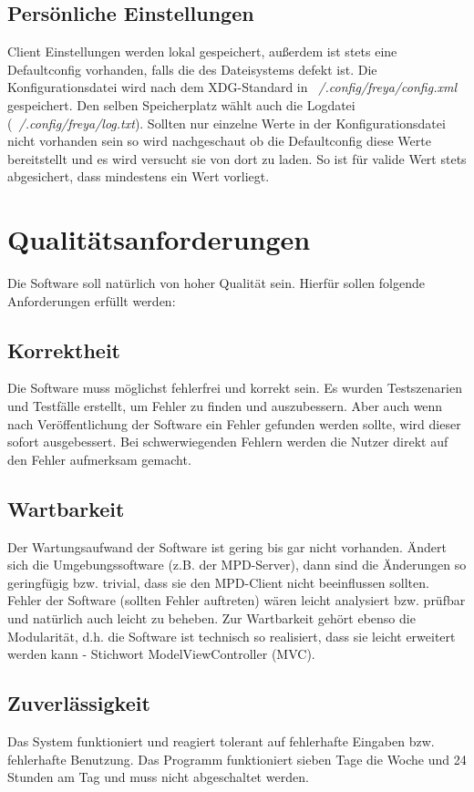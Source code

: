 \subsection{Persönliche Einstellungen}
Client Einstellungen werden lokal gespeichert, außerdem ist stets eine Defaultconfig vorhanden, falls die des Dateisystems defekt ist.
Die Konfigurationsdatei wird nach dem XDG-Standard in \emph{~/.config/freya/config.xml} gespeichert. Den selben Speicherplatz wählt auch die Logdatei 
(\emph{~/.config/freya/log.txt}). Sollten nur einzelne Werte in der Konfigurationsdatei nicht vorhanden sein so wird nachgeschaut ob die Defaultconfig
diese Werte bereitstellt und es wird versucht sie von dort zu laden. So ist für valide Wert stets abgesichert, dass mindestens ein Wert vorliegt.
\section{Qualitätsanforderungen}
Die Software soll natürlich von hoher Qualität sein. Hierfür sollen folgende
Anforderungen erfüllt werden:
\subsection{Korrektheit}
Die Software muss möglichst fehlerfrei und korrekt sein. Es wurden Testszenarien und Testfälle erstellt,
um Fehler zu finden und auszubessern. Aber auch wenn nach Veröffentlichung der Software ein 
Fehler gefunden werden sollte, wird dieser sofort ausgebessert. Bei schwerwiegenden Fehlern
werden die Nutzer direkt auf den Fehler aufmerksam gemacht.
\subsection{Wartbarkeit}
Der Wartungsaufwand der Software ist gering bis gar nicht vorhanden. Ändert sich die Umgebungssoftware
(z.B. der MPD-Server), dann sind die Änderungen so geringfügig bzw. trivial, dass sie den MPD-Client 
nicht beeinflussen sollten. Fehler der Software (sollten Fehler auftreten) wären leicht analysiert bzw.
prüfbar und natürlich auch leicht zu beheben. Zur Wartbarkeit gehört ebenso die Modularität, d.h.
die Software ist technisch so realisiert, dass sie leicht erweitert werden kann - Stichwort ModelViewController (MVC). 
\subsection{Zuverlässigkeit}
Das System funktioniert und reagiert tolerant auf fehlerhafte Eingaben bzw. fehlerhafte Benutzung.
Das Programm funktioniert sieben Tage die Woche und 24 Stunden am Tag und muss nicht abgeschaltet werden.

